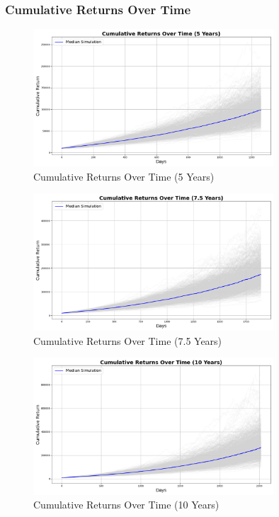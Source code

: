 \subsubsection{Cumulative Returns Over Time}

\begin{figure}[!htbp]
    \centering
    \includegraphics[width=0.8\textwidth]{../Figures/cumulative_returns_over_time_5_years.png}
    \caption{Cumulative Returns Over Time (5 Years)}
    \label{fig:cumulative_returns_5y}
\end{figure}

\begin{figure}[!htbp]
    \centering
    \includegraphics[width=0.8\textwidth]{../Figures/cumulative_returns_over_time_7_5_years.png}
    \caption{Cumulative Returns Over Time (7.5 Years)}
    \label{fig:cumulative_returns_7_5y}
\end{figure}

\begin{figure}[!htbp]
    \centering
    \includegraphics[width=0.8\textwidth]{../Figures/cumulative_returns_over_time_10_years.png}
    \caption{Cumulative Returns Over Time (10 Years)}
    \label{fig:cumulative_returns_10y}
\end{figure}





